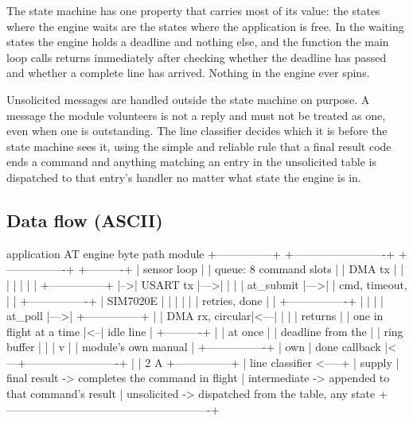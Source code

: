 The state machine has one property that carries most of its value: the states
where the engine waits are the states where the application is free. In the
waiting states the engine holds a deadline and nothing else, and the function
the main loop calls returns immediately after checking whether the deadline has
passed and whether a complete line has arrived. Nothing in the engine ever spins.

Unsolicited messages are handled outside the state machine on purpose. A message
the module volunteers is not a reply and must not be treated as one, even when
one is outstanding. The line classifier decides which it is before the state
machine sees it, using the simple and reliable rule that a final result code
ends a command and anything matching an entry in the unsolicited table is
dispatched to that entry's handler no matter what state the engine is in.

\subsection*{Data flow (ASCII)}

\begin{asciiart}
  application           AT engine                     byte path             module
  +---------------+    +-------------------------+   +----------------+    +----------+
  | sensor loop   |    | queue: 8 command slots  |   | DMA tx         |    |          |
  |   |           |    |   +---------------+     |-->| USART tx       |--->|          |
  |   | at_submit |--->|   | cmd, timeout, |     |   +----------------+    | SIM7020E |
  |   |           |    |   | retries, done |     |   +----------------+    |          |
  |   | at_poll   |--->|   +---------------+     |   | DMA rx, circular|<---|          |
  |   |  returns  |    | one in flight at a time |<--| idle line        |   +----------+
  |   |  at once  |    |   deadline from the     |   | ring buffer      |       |
  |   v           |    |   module's own manual   |   +----------------+        | own
  | done callback |<---+-------------------------+          |                  | 2 A
  +---------------+    | line classifier              <-----+                  | supply
                       |   final result -> completes the command in flight
                       |   intermediate  -> appended to that command's result
                       |   unsolicited   -> dispatched from the table, any state
                       +-------------------------------------------------------+
\end{asciiart}

